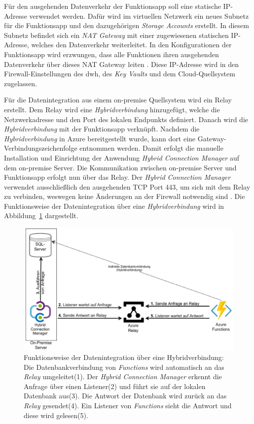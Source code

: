 Für den ausgehenden Datenverkehr der Funktionsapp soll eine statische IP-Adresse verwendet werden. Dafür wird im virtuellen Netzwerk ein neues Subnetz für die Funktionsapp und den dazugehörigen \textit{Storage Accounts} erstellt. In diesem Subnetz befindet sich ein \textit{NAT Gateway} mit einer zugewiesenen statischen IP-Adresse, welches den Datenverkehr weiterleitet. In den Konfigurationen der Funktionsapp wird erzwungen, dass alle Funktionen ihren ausgehenden Datenverkehr über dieses NAT Gateway leiten \cite[vgl.][]{msdoc_22_func_ip}. Diese IP-Adresse wird in den Firewall-Einstellungen des \ac{dwh}, des \textit{Key Vaults} und dem Cloud-Quellsystem zugelassen.

Für die Datenintegration aus einem on-premise Quellsystem wird ein Relay erstellt. Dem Relay wird eine \textit{Hybridverbindung} hinzugefügt, welche die Netzwerkadresse und den Port des lokalen Endpunkts definiert. Danach wird die \textit{Hybridverbindung} mit der Funktionsapp verknüpft. Nachdem die \textit{Hybridverbindung} in Azure bereitgestellt wurde, kann dort eine Gateway-Verbindungszeichenfolge entnommen werden. Damit erfolgt die manuelle Installation und Einrichtung der Anwendung \textit{Hybrid Connection Manager} auf dem on-premise Server. Die Kommunikation zwischen on-premise Server und Funktionsapp erfolgt nun über das Relay. Der \textit{Hybrid Connection Manager} verwendet ausschließlich den ausgehenden TCP Port 443, um sich mit dem Relay zu verbinden, weswegen keine Änderungen an der Firewall notwendig sind \cite[vgl.][]{msdoc_22_func_hybridConn}. Die Funktionsweise der Datenintegration über eine \textit{Hybridverbindung} wird in Abbildung~\ref{fig:chap04_hybridConn} dargestellt.

 \begin{figure}[htbp]
 \centering
 \includegraphics[width=\textwidth]{gfx/azure/hybridverbindung.pdf}
 \caption[Datenintegration über Hybridverbindung]{Funktionsweise der Datenintegration über eine Hybridverbindung: Die Datenbankverbindung von \textit{Functions} wird automatisch an das \textit{Relay} umgeleitet(1). Der \textit{Hybrid Connection Manager} erkennt die Anfrage über einen Listener(2) und führt sie auf der lokalen Datenbank aus(3). Die Antwort der Datenbank wird zurück an das \textit{Relay} gesendet(4). Ein Listener von \textit{Functions} sieht die Antwort und diese wird gelesen(5). \cite[vgl.][]{msdoc_22_func_hybridConn, msdoc_21_hybridConn_protocol}}
\label{fig:chap04_hybridConn}
\end{figure}


